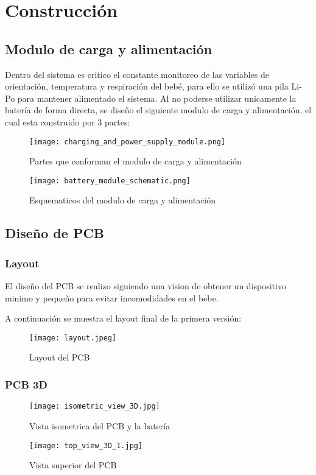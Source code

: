 \section{Construcción}

\subsection{Modulo de carga y alimentación}

Dentro del sistema es critico el constante monitoreo de las variables de orientación,
temperatura y respiración del bebé, para ello se utilizó una pila Li-Po para mantener
alimentado el sistema. Al no poderse utilizar unicamente la batería de forma directa, se
diseño el siguiente modulo de carga y alimentación, el cual esta construido por 3 partes:

\begin{figure}[htp!]
    \centering
    \texttt{[image: charging\_and\_power\_supply\_module.png]}
    \caption{Partes que conforman el modulo de carga y alimentación}
    \label{fig: charging_and_power_module}
\end{figure}
\FloatBarrier

\begin{figure}[htp!]
    \centering
    \texttt{[image: battery\_module\_schematic.png]}
    \caption{Esquematicos del modulo de carga y alimentación}
    \label{fig: battery_module_schematic}
\end{figure}
\FloatBarrier

\subsection{Diseño de PCB}

\subsubsection{Layout}
El diseño del PCB se realizo siguiendo una vision de obtener un dispositivo
minimo y pequeño para evitar incomodidades en el bebe.

A continuación se muestra el layout final de la primera versión:

\begin{figure}[htp!]
    \centering
    \texttt{[image: layout.jpeg]}
    \caption{Layout del PCB}
    \label{fig: layout}
\end{figure}
\FloatBarrier

\subsubsection{PCB 3D}
\begin{figure}[htp!]
    \centering
    \texttt{[image: isometric\_view\_3D.jpg]}
    \caption{Vista isometrica del PCB y la batería}
    \label{fig: isometric_3d}
\end{figure}
\FloatBarrier
\begin{figure}[htp!]
    \centering
    \texttt{[image: top\_view\_3D\_1.jpg]}
    \caption{Vista superior del PCB}
    \label{fig: top_3d}
\end{figure}
\FloatBarrier

